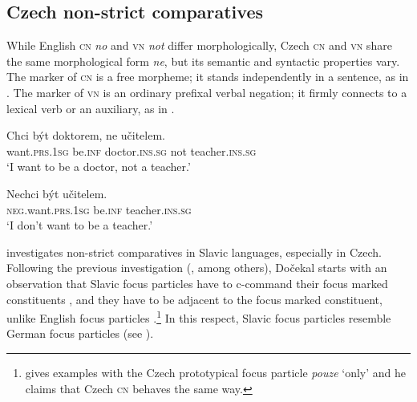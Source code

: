 \documentclass[output=paper,
]{langscibook}
\begin{document}
\subsection{Czech non-strict comparatives}

While English \textsc{cn} \textit{no} and \textsc{vn} \textit{not} differ morphologically,  Czech \textsc{cn} and \textsc{vn} share the same morphological form \textit{ne}, but its semantic and syntactic properties vary. The marker of \textsc{cn} is a free morpheme; it stands independently in a sentence, as in . The marker of \textsc{vn} is an ordinary prefixal verbal negation; it firmly connects to a lexical verb or an auxiliary, as in .

\ea 
\gll Chci být doktorem, ne učitelem.\\
want.\textsc{prs.1sg} be.\textsc{inf} doctor.\textsc{ins.sg} not teacher.\textsc{ins.sg}\\
\glt `I want to be a doctor, not a teacher.' \label{ex:cz_cn}
\z

\ea 
\gll Nechci být učitelem.\\
\textsc{neg}.want.\textsc{prs.1sg} be.\textsc{inf} teacher.\textsc{ins.sg}\\
\glt `I don't want to be a teacher.' \label{ex:cz_vn}
\z


\noindent \cite{dovcekal2017upper} investigates non-strict comparatives in Slavic languages, especially in Czech. Following the previous investigation (\citealt{jasinskaja2016information}, among others), Dočekal starts with an observation that Slavic focus particles have to c-command their focus marked constituents , and they have to be adjacent to the focus marked constituent, unlike English focus particles .\footnote{\cite{dovcekal2017upper} gives examples with the Czech prototypical focus particle \textit{pouze} `only' and he claims that Czech \textsc{cn} behaves the same way.} In this respect, Slavic focus particles resemble German focus particles (see \citealt{buring2001v3}). 
\end{document}
